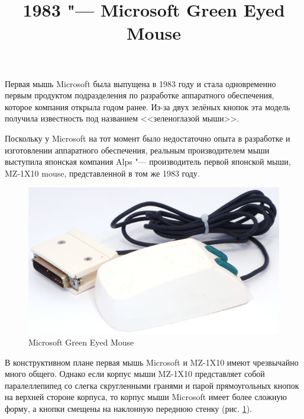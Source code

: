 \documentclass[11pt, a4paper]{article}
\begin{document}
\title{1983 "--- Microsoft Green Eyed Mouse}
\date{}
\maketitle
{}

Первая мышь Microsoft была выпущена в 1983 году и стала одновременно первым продуктом подразделения по разработке аппаратного обеспечения, которое компания открыла годом ранее. Из-за двух зелёных кнопок эта модель получила известность под названием <<зеленоглазой мыши>>.

Поскольку у Microsoft на тот момент было недостаточно опыта в разработке и изготовлении аппаратного обеспечения, реальным производителем мыши выступила японская компания Alps "--- производитель первой японской мыши, MZ-1X10 mouse, представленной в том же 1983 году.

\begin{figure}[h]
   \centering
    \includegraphics[scale=0.6]{1983_microsoft_green_eyed_mouse/pic_30.jpg}
    \caption{Microsoft Green Eyed Mouse}
    \label{fig:MicrosoftGreenEyedPic}
\end{figure}

В конструктивном плане первая мышь Microsoft и MZ-1X10 имеют чрезвычайно много общего. Однако если корпус мыши MZ-1X10 представляет собой паралеллепипед со слегка скругленными гранями и парой прямоугольных кнопок на верхней стороне корпуса, то корпус мыши Microsoft имеет более сложную форму, а кнопки смещены на наклонную переднюю стенку (рис.  \ref{fig:MicrosoftGreenEyedPic}).
\end{document}
